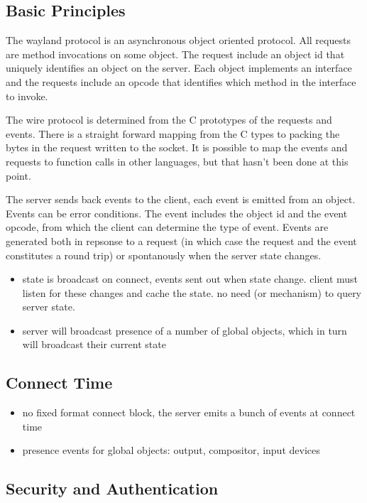 \documentclass{article}
\begin{document}
\subsection{Basic Principles}

The wayland protocol is an asynchronous object oriented protocol.  All
requests are method invocations on some object.  The request include
an object id that uniquely identifies an object on the server.  Each
object implements an interface and the requests include an opcode that
identifies which method in the interface to invoke.

The wire protocol is determined from the C prototypes of the requests
and events.  There is a straight forward mapping from the C types to
packing the bytes in the request written to the socket.  It is
possible to map the events and requests to function calls in other
languages, but that hasn't been done at this point.

The server sends back events to the client, each event is emitted from
an object.  Events can be error conditions.  The event includes the
object id and the event opcode, from which the client can determine
the type of event.  Events are generated both in repsonse to a request
(in which case the request and the event constitutes a round trip) or
spontanously when the server state changes.

\begin{itemize}
\item state is broadcast on connect, events sent out when state
  change.  client must listen for these changes and cache the state.
  no need (or mechanism) to query server state.

\item server will broadcast presence of a number of global objects,
  which in turn will broadcast their current state
\end{itemize}

\subsection{Connect Time}

\begin{itemize}
\item no fixed format connect block, the server emits a bunch of
  events at connect time
\item presence events for global objects: output, compositor, input
  devices
\end{itemize}
\subsection{Security and Authentication}
\end{document}
